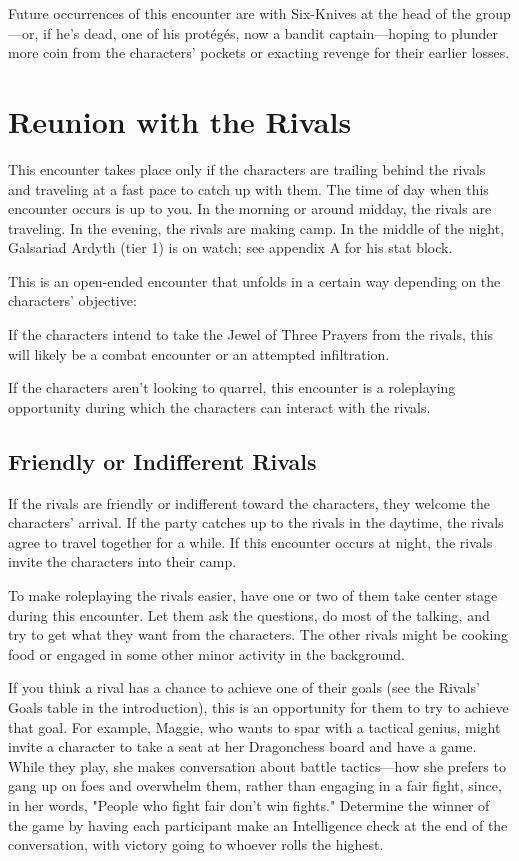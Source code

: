 \documentclass[10pt,a4paper,twoside,bg=print,twocolumn,openany,nodeprecatedcode]{dndbook}
\begin{document}
Future occurrences of this encounter are with Six-Knives at the head of the group—or, if he's dead, one of his protégés, now a bandit captain—hoping to plunder more coin from the characters' pockets or exacting revenge for their earlier losses.



\section{Reunion with the Rivals}
This encounter takes place only if the characters are trailing behind the rivals and traveling at a fast pace to catch up with them. The time of day when this encounter occurs is up to you. In the morning or around midday, the rivals are traveling. In the evening, the rivals are making camp. In the middle of the night, Galsariad Ardyth (tier 1) is on watch; see appendix A for his stat block.

This is an open-ended encounter that unfolds in a certain way depending on the characters' objective:


\begin{description}[nolistsep]
\item[Jewel Theft.]
If the characters intend to take the Jewel of Three Prayers from the rivals, this will likely be a combat encounter or an attempted infiltration.
\item[No Quarrel.]
If the characters aren't looking to quarrel, this encounter is a roleplaying opportunity during which the characters can interact with the rivals.
\end{description}

\subsection{Friendly or Indifferent Rivals}
If the rivals are friendly or indifferent toward the characters, they welcome the characters' arrival. If the party catches up to the rivals in the daytime, the rivals agree to travel together for a while. If this encounter occurs at night, the rivals invite the characters into their camp.

To make roleplaying the rivals easier, have one or two of them take center stage during this encounter. Let them ask the questions, do most of the talking, and try to get what they want from the characters. The other rivals might be cooking food or engaged in some other minor activity in the background.

If you think a rival has a chance to achieve one of their goals (see the Rivals' Goals table in the introduction), this is an opportunity for them to try to achieve that goal. For example, Maggie, who wants to spar with a tactical genius, might invite a character to take a seat at her Dragonchess board and have a game. While they play, she makes conversation about battle tactics—how she prefers to gang up on foes and overwhelm them, rather than engaging in a fair fight, since, in her words, "People who fight fair don't win fights." Determine the winner of the game by having each participant make an Intelligence check at the end of the conversation, with victory going to whoever rolls the highest.
\end{document}
